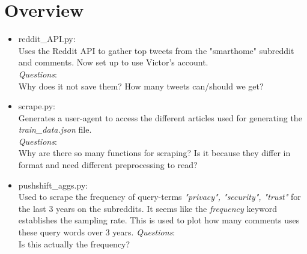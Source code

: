 \documentclass{article}
\begin{document}
\section{Overview}
\begin{itemize}
	\item reddit\_API.py:\\
	Uses the Reddit API to gather top tweets
	from the "smarthome" subreddit and comments.
	Now set up to use Victor's account.\\
	\emph{Questions}: \\ Why does it not save them?
	How many tweets can/should we get?
	\item scrape.py:\\
	Generates a user-agent to access the different 
	articles used for generating the \textit{train\_data.json} file.\\
	\emph{Questions}: \\ 
	Why are there so many functions for scraping? 
	Is it because they differ in format and need different preprocessing to read?
	\item pushshift\_aggs.py:\\
	Used to scrape the frequency of query-terms 
	\textit{"privacy", "security", "trust"} for the last 3 years on the subreddits. 
	It seems like the \textit{frequency} keyword establishes the sampling rate.
	This is used to plot how many comments uses these query words over 3 years.
	\emph{Questions}: \\ 
	Is this actually the frequency?
\end{itemize}
\end{document}
